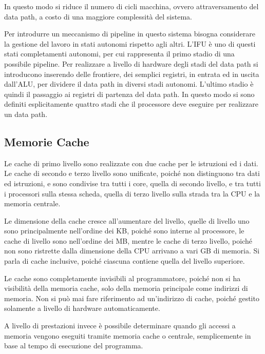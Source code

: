 \documentclass{article}
\numberwithin{equation}{subsection}
\begin{document}

In questo modo si riduce il numero di cicli macchina, ovvero attraversamento del data path, a costo di una maggiore complessità del sistema. 

Per introdurre un meccanismo di pipeline in questo sistema bisogna considerare la gestione del lavoro in stati autonomi rispetto agli altri. L'IFU è uno di questi stati 
completamenti autonomi, per cui rappresenta il primo stadio di una possibile pipeline. Per realizzare a livello di hardware degli stadi del data path si introducono inserendo 
delle frontiere, dei semplici registri, in entrata ed in uscita dall'ALU, per dividere il data path in diversi stadi autonomi. L'ultimo stadio è quindi il passaggio ai registri 
di partenza del data path. In questo modo si sono definiti esplicitamente quattro stadi che il processore deve eseguire per realizzare un data path. 



\subsection{Memorie Cache}

Le cache di primo livello sono realizzate con due cache per le istruzioni ed i dati. Le cache di secondo e terzo livello sono unificate, poiché non distinguono tra dati ed 
istruzioni, e sono condivise tra tutti i core, quella di secondo livello, e tra tutti i processori sulla stessa scheda, quella di terzo livello sulla strada tra la CPU e la 
memoria centrale. 

Le dimensione della cache cresce all'aumentare del livello, quelle di livello uno sono principalmente nell'ordine dei KB, poiché sono interne al processore, le cache di 
livello sono nell'ordine dei MB, mentre le cache di terzo livello, poiché non sono ristrette dalla dimensione della CPU arrivano a vari GB di memoria. 
Si parla di cache inclusive, poiché ciascuna contiene quella del livello superiore. 

Le cache sono completamente invisibili al programmatore, poiché non si ha visibilità della memoria cache, solo della memoria principale come indirizzi di memoria. Non si 
può mai fare riferimento ad un'indirizzo di cache, poiché gestito solamente a livello di hardware automaticamente. 

A livello di prestazioni invece è possibile determinare quando gli accessi a memoria vengono eseguiti tramite memoria cache o centrale, semplicemente in base al tempo di 
esecuzione del programma. 
\end{document}
